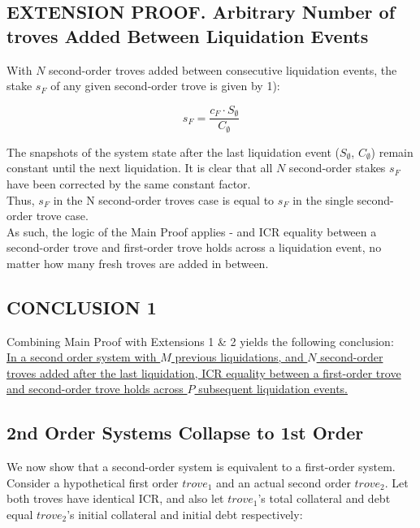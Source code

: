 \documentclass[reqno]{article}
\begin{document}
\subsection{EXTENSION PROOF. Arbitrary Number of troves Added Between Liquidation Events}

With $N$ second-order troves added between consecutive liquidation events, the stake $s_F$ of any given second-order trove is given by 1): 

\begin{equation} 
    s_F=\frac{c_F \cdot S_\emptyset}{C_\emptyset}
\end{equation}

\bigskip
The snapshots of the system state after the last liquidation event ($S_\emptyset$, $C_\emptyset$) remain constant until the next liquidation. It is clear that all $N$ second-order stakes $s_F$ have been corrected by the same constant factor.\\

Thus, $s_F$ in the N second-order troves case is equal to $s_F$ in the single second-order trove case.\\

As such, the logic of the Main Proof applies - and ICR equality between a second-order trove and first-order trove holds across a liquidation event, no matter how many fresh troves are added in between.

\subsection{CONCLUSION 1}

\bigskip
Combining Main Proof with Extensions 1 \& 2 yields the following conclusion:\\

\uline{In a second order system with $M$ previous liquidations, and $N$ second-order troves added after the last liquidation, ICR equality between a first-order trove and second-order trove holds across $P$ subsequent liquidation events.}\\

\subsection{2nd Order Systems Collapse to 1st Order}
We now show that a second-order system is equivalent to a first-order system.\\

Consider a hypothetical first order $trove_1$ and an actual second order $trove_2$. Let both troves have identical ICR, and also let $trove_1$’s total collateral and debt equal $trove_2$’s initial collateral and initial debt respectively:
\end{document}

